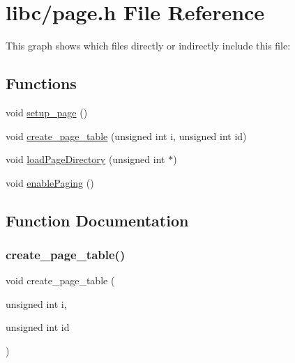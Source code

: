 \hypertarget{a00047}{}\section{libc/page.h File Reference}
\label{a00047}
This graph shows which files directly or indirectly include this file\+:
\subsection*{Functions}
\begin{DoxyCompactItemize}
\item 
void \hyperlink{a00047_a51f6a37816540dea572d38f2713e9f5a_a51f6a37816540dea572d38f2713e9f5a}{setup\+\_\+page} ()
\item 
void \hyperlink{a00047_a7bb2c9b4c69002e17903710ce4de395c_a7bb2c9b4c69002e17903710ce4de395c}{create\+\_\+page\+\_\+table} (unsigned int i, unsigned int id)
\item 
void \hyperlink{a00047_abfdf37b9c42cafa83b39f1a41264989c_abfdf37b9c42cafa83b39f1a41264989c}{load\+Page\+Directory} (unsigned int $\ast$)
\item 
void \hyperlink{a00047_a8fe3a9cca4b2ccd7a2743e9943880a32_a8fe3a9cca4b2ccd7a2743e9943880a32}{enable\+Paging} ()
\end{DoxyCompactItemize}


\subsection{Function Documentation}
\mbox{\label{a00047_a7bb2c9b4c69002e17903710ce4de395c_a7bb2c9b4c69002e17903710ce4de395c}} 
\subsubsection{\texorpdfstring{create\+\_\+page\+\_\+table()}{create\_page\_table()}}
{\footnotesize\ttfamily void create\+\_\+page\+\_\+table (\begin{DoxyParamCaption}\item[{unsigned int}]{i,  }\item[{unsigned int}]{id }\end{DoxyParamCaption})}



